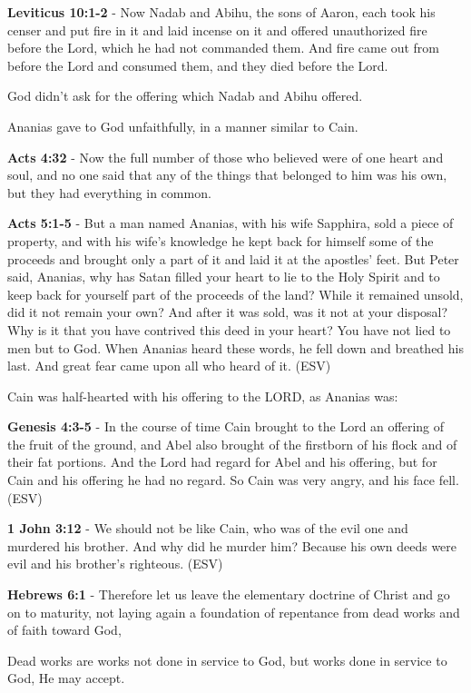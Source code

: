 \documentclass[11pt]{article}
\begin{document}
\textbf{Leviticus 10:1-2} - Now Nadab and Abihu, the sons of Aaron, each took his censer and put fire in it and laid incense on it and offered unauthorized fire before the Lord, which he had not commanded them. And fire came out from before the Lord and consumed them, and they died before the Lord.

God didn't ask for the offering which Nadab and Abihu offered.

Ananias gave to God unfaithfully, in a manner similar to Cain.

\textbf{Acts 4:32} - Now the full number of those who believed were of one heart and soul, and no one said that any of the things that belonged to him was his own, but they had everything in common.

\textbf{Acts 5:1-5} -  But a man named Ananias, with his wife Sapphira, sold a piece of property, and with his wife's knowledge he kept back for himself some of the proceeds and brought only a part of it and laid it at the apostles' feet.  But Peter said, Ananias, why has Satan filled your heart to lie to the Holy Spirit and to keep back for yourself part of the proceeds of the land?  While it remained unsold, did it not remain your own?  And after it was sold, was it not at your disposal?  Why is it that you have contrived this deed in your heart?  You have not lied to men but to God.  When Ananias heard these words, he fell down and breathed his last.  And great fear came upon all who heard of it.  (ESV)

Cain was half-hearted with his offering to the LORD, as Ananias was:

\textbf{Genesis 4:3-5} - In the course of time Cain brought to the Lord an offering of the fruit of the ground, and Abel also brought of the firstborn of his flock and of their fat portions. And the Lord had regard for Abel and his offering, but for Cain and his offering he had no regard. So Cain was very angry, and his face fell. (ESV)

\textbf{1 John 3:12} - We should not be like Cain, who was of the evil one and murdered his brother. And why did he murder him? Because his own deeds were evil and his brother's righteous. (ESV)

\textbf{Hebrews 6:1} - Therefore let us leave the elementary doctrine of Christ and go on to maturity, not laying again a foundation of repentance from dead works and of faith toward God,

Dead works are works not done in service to God, but works done in service to God, He may accept.
\end{document}
